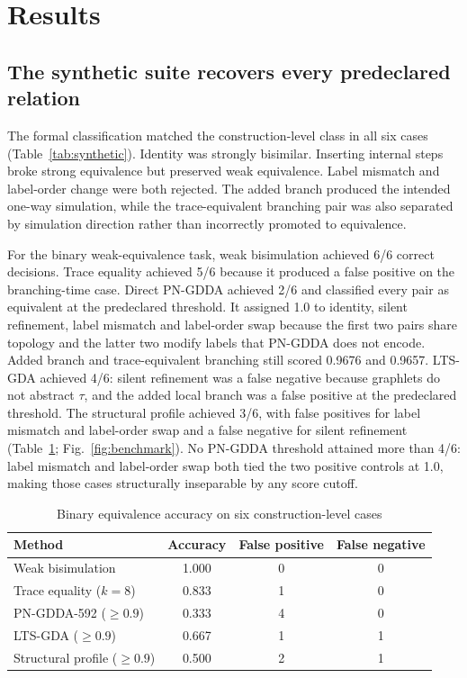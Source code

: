 \documentclass[JMCS,submit]{resources/ISRP}
\theoremstyle{definition}
\theoremstyle{remark}
\numberwithin{equation}{section}
\newcommand{\TAU}{\tau}
\begin{document}
\section{Results}\label{sec:results}

\subsection{The synthetic suite recovers every predeclared relation}
\label{sec:benchmark-results}

The formal classification matched the construction-level class in all six cases
(Table~\ref{tab:synthetic}). Identity was strongly bisimilar. Inserting internal
steps broke strong equivalence but preserved weak equivalence. Label mismatch and
label-order change were both rejected. The added branch produced the intended
one-way simulation, while the trace-equivalent branching pair was also separated
by simulation direction rather than incorrectly promoted to equivalence.

For the binary weak-equivalence task, weak bisimulation achieved 6/6 correct
decisions. Trace equality achieved 5/6 because it produced a false positive on
the branching-time case. Direct PN-GDDA achieved 2/6 and classified every pair
as equivalent at the predeclared threshold. It assigned 1.0 to identity, silent
refinement, label mismatch and label-order swap because the first two pairs share
topology and the latter two modify labels that PN-GDDA does not encode. Added
branch and trace-equivalent branching still scored 0.9676 and 0.9657. LTS-GDA
achieved 4/6: silent refinement was a false
negative because graphlets do not abstract $\TAU$, and the added local branch was
a false positive at the predeclared threshold. The structural profile achieved
3/6, with false positives for label mismatch and label-order swap and a false
negative for silent refinement (Table~\ref{tab:baseline};
Fig.~\ref{fig:benchmark}).
No PN-GDDA threshold attained more than 4/6: label mismatch and label-order swap
both tied the two positive controls at 1.0, making those cases structurally
inseparable by any score cutoff.

\begin{table}[t]
\caption{Binary equivalence accuracy on six construction-level cases}
\label{tab:baseline}
\centering
\begin{tabular}{lccc}
\toprule
Method & Accuracy & False positive & False negative \\
\midrule
Weak bisimulation & 1.000 & 0 & 0 \\
Trace equality ($k=8$) & 0.833 & 1 & 0 \\
PN-GDDA-592 ($\geq0.9$) & 0.333 & 4 & 0 \\
LTS-GDA ($\geq0.9$) & 0.667 & 1 & 1 \\
Structural profile ($\geq0.9$) & 0.500 & 2 & 1 \\
\bottomrule
\end{tabular}
\end{table}
\end{document}
